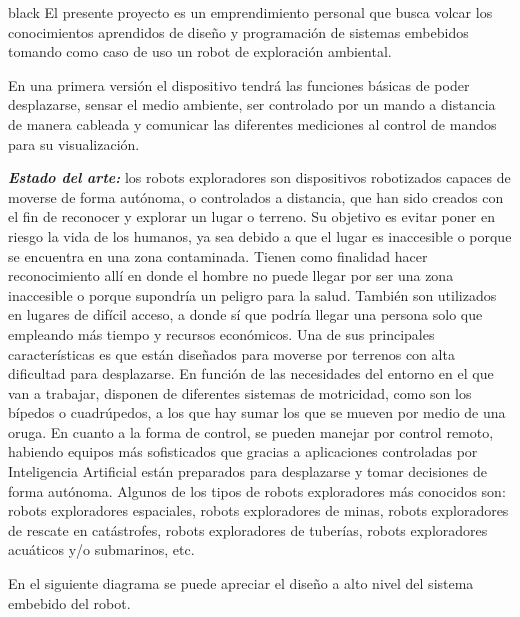 \documentclass[
11pt, %
]{charter}
\begin{document}
\begin{consigna}{black} %
El presente proyecto es un emprendimiento personal que busca volcar los conocimientos aprendidos de diseño y programación de sistemas embebidos tomando como caso de uso un robot de exploración ambiental. 

En una primera versión el dispositivo tendrá las funciones básicas de poder desplazarse, sensar el medio ambiente, ser controlado por un mando a distancia de manera cableada y comunicar las diferentes mediciones al control de mandos para su visualización.


\textit{\textbf{Estado del arte:}}
los robots exploradores son dispositivos robotizados capaces de moverse de forma autónoma, o controlados a distancia, que han sido creados con el fin de reconocer y explorar un lugar o terreno. Su objetivo es evitar poner en riesgo la vida de los humanos, ya sea debido a que el lugar es inaccesible o porque se encuentra en una zona contaminada.
Tienen como finalidad hacer reconocimiento allí en donde el hombre no puede llegar por ser una zona inaccesible o porque supondría un peligro para la salud. También son utilizados en lugares de difícil acceso, a donde sí que podría llegar una persona solo que empleando más tiempo y recursos económicos.
Una de sus principales características es que están diseñados para moverse por terrenos con alta dificultad para desplazarse. En función de las necesidades del entorno en el que van a trabajar, disponen de diferentes sistemas de motricidad, como son los bípedos o cuadrúpedos, a los que hay sumar los que se mueven por medio de una oruga.
En cuanto a la forma de control, se pueden manejar por control remoto, habiendo equipos más sofisticados que gracias a aplicaciones controladas por Inteligencia Artificial están preparados para desplazarse y tomar decisiones de forma autónoma.
Algunos de los tipos de robots exploradores más conocidos son: robots exploradores espaciales, robots exploradores de minas, robots exploradores de rescate en catástrofes, robots exploradores de tuberías, robots exploradores acuáticos y/o submarinos, etc.

En el siguiente diagrama se puede apreciar el diseño a alto nivel del sistema embebido del robot.


\end{consigna}
\end{document}
